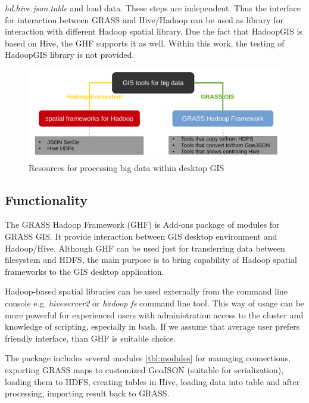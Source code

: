 \documentclass[a4paper,12pt,oneside]{report}
\begin{document}
    \textit{hd.hive.json.table} and load data. These steps are independent.
    Thus the interface for interaction between GRASS and
    Hive/Hadoop can be used as library for interaction with different Hadoop spatial library.
    Due the fact that HadoopGIS is based on Hive, the GHF supports it as well. 
    Within this work, the testing of HadoopGIS library is not provided.

	
	\begin{figure}[!htbp]
		\centering
		\includegraphics[width=1\textwidth]{./img/idea_schema.pdf}
		\caption[Resources]{\centering Resources for processing big data within
			desktop GIS}
	\end{figure} 
	
	
	\subsection{Functionality}
    The GRASS Hadoop Framework (GHF) is Add-ons package of modules
    for GRASS GIS. It provide interaction between GIS desktop environment and
    Hadoop/Hive. Although GHF can be used just for transferring data between filesystem
    and HDFS, the main purpose is to bring capability of Hadoop spatial
    frameworks  to the GIS desktop application. 
    
    Hadoop-based spatial libraries can be used externally from the
    command line console e.g. \textit{hiveserver2} or \textit{hadoop fs}
    command line tool. This way of usage can be more powerful for experienced users with
    administration access to the cluster and knowledge of scripting, especially in bash.
    If we assume that average user prefers friendly interface, than GHF is suitable
    choice. 
    
    The package includes several modules \ref{tbl:modules} for managing connections,
    exporting GRASS maps to customized GeoJSON (suitable for serialization), loading
    them to HDFS, creating tables in Hive, loading data into table and after
    processing, importing result back to GRASS.
\end{document}
